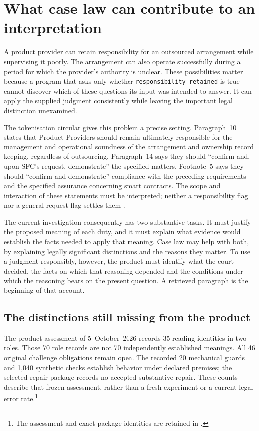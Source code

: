 \section{What case law can contribute to an interpretation}
\label{sec:legal-interpretation-reuse}

A product provider can retain responsibility for an outsourced arrangement
while supervising it poorly. The arrangement can also operate successfully
during a period for which the provider's authority is unclear. These
possibilities matter because a program that asks only whether
\texttt{responsibility\_retained} is true cannot discover which of these
questions its input was intended to answer. It can apply the supplied judgment
consistently while leaving the important legal distinction unexamined.

The tokenisation circular gives this problem a precise setting.
Paragraph~10 states that Product Providers should remain ultimately
responsible for the management and operational soundness of the arrangement
and ownership record keeping, regardless of outsourcing. Paragraph~14 says
they should “confirm and, upon SFC's request, demonstrate” the specified
matters. Footnote~5 says they should “confirm and demonstrate” compliance
with the preceding requirements and the specified assurance concerning smart
contracts. The scope and interaction of these statements must be interpreted;
neither a responsibility flag nor a general request flag settles them
\citep[paras.~10--16 and n.~5]{sfctoken2026}.

The current investigation consequently has two substantive tasks. It must
justify the proposed meaning of each duty, and it must explain what evidence
would establish the facts needed to apply that meaning. Case law may help
with both, by explaining legally significant distinctions and the reasons
they matter. To use a judgment responsibly, however, the product must identify
what the court decided, the facts on which that reasoning depended and the
conditions under which the reasoning bears on the present question. A
retrieved paragraph is the beginning of that account.

\subsection{The distinctions still missing from the product}

The product assessment of 5~October~2026 records 35 reading identities in two
roles. Those 70 role records are not 70 independently established meanings.
All 46 original challenge obligations remain open. The recorded 20
mechanical guards and 1,040 synthetic checks establish behavior under declared
premises; the selected repair package records no accepted substantive repair.
These counts describe that frozen assessment, rather than a fresh experiment
or a current legal error rate.\footnote{The assessment and exact package
identities are retained in
.}

